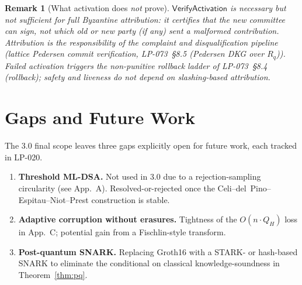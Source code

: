 \documentclass[11pt]{article}
\newtheorem{remark}{Remark}
\begin{document}
\begin{remark}[What activation does \emph{not} prove]
$\mathsf{VerifyActivation}$ is necessary but not sufficient for full
Byzantine attribution: it certifies that the new committee can sign,
not which old or new party (if any) sent a malformed contribution.
Attribution is the responsibility of the complaint and disqualification
pipeline (lattice Pedersen commit verification, LP-073~\S8.5
(Pedersen DKG over $R_q$)). Failed activation triggers the non-punitive
rollback ladder of LP-073~\S8.4 (rollback); safety and
liveness do not depend on slashing-based attribution.
\end{remark}

\section{Gaps and Future Work}
\label{sec:gaps}

The 3.0 final scope leaves three gaps explicitly open for future work,
each tracked in LP-020.

\begin{enumerate}[nosep]
  \item \textbf{Threshold ML-DSA.}  Not used in 3.0 due to a
    rejection-sampling circularity (see App.~A).  Resolved-or-rejected
    once the Celi--del~Pino--Espitau--Niot--Prest construction is
    stable.
  \item \textbf{Adaptive corruption without erasures.}  Tightness of
    the $O(n \cdot Q_H)$ loss in App.~C; potential gain from a
    Fischlin-style transform.
  \item \textbf{Post-quantum SNARK.}  Replacing Groth16 with a STARK-
    or hash-based SNARK to eliminate the conditional on classical
    knowledge-soundness in Theorem~\ref{thm:pq}.
\end{enumerate}
\end{document}
